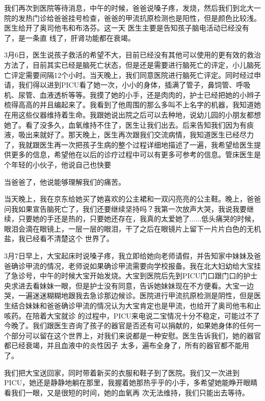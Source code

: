 \documentclass{article}
\begin{document}
我们再次到医院等待消息，中午的时候，爸爸说嗓子疼，发烧，然后我们到北大一院的发热门诊给爸爸挂号检查，爸爸的甲流抗原检测也是阳性，但是颜色比较浅。医生给开了奥司他韦和布洛芬。这一天
\newpage
医生主要是告知孩子脑电活动已经没有了，是一条直
线了，肝肾功能都在衰竭。 

3月6日，医生说孩子救活的希望不大，目前已经没有其他可以使用的更有效的救治方法了，目前其实已经是脑死亡状态，但是还是需要进行脑死亡的评定，小儿脑死亡评定需要间隔12个小时。当天晚上，我们同意医院进行脑死亡评定。同时经过申请，我们得以进到PICU看了她一次，小小的身体，插满了管子，鼻饲管、呼吸机、尿管、血液透析等等。我摸了她的小手，还是肉肉的，护士已经把她的小辫子梳得高高的并且编起来了。我看到了他周围的那么多叫不上名字的机器，我知道她在用这些仪器维持着生命。我跟她说出院之后可以去种地，说幼儿园的小朋友都想她了。看了没多久，血氧维持不住了，医生让我们出去。后来告知我们因为有痰液，吸出来就好了。那天晚上，医生再次跟我们交流病情，我知道医生已经尽力了，我就跟医生再一次把孩子生病的整个过程详细地描述了一遍，我希望给医生提供更多的信息，希望他在以后的诊疗过程中可以有更多可参考的信息。管床医生是个年轻的小伙子，他说自己也快要
\newpage

当爸爸了，他说能够理解我们的痛苦。 

当天晚上，我在京东给她买了她喜欢的公主裙和一双闪亮亮的公主鞋。晚上，爸爸问我如果宣告脑死亡了，我们还要继续坚持吗？我第一次放声大哭，我说我要继续，只要她的手还是热的，只要她还存在，我真的太爱她了......低头痛哭的时候，眼泪会滴在眼镜上，一层一层的眼泪，干了之后在眼镜片上留下一片片白色的无机盐，我已经看不清楚这个
世界了。 

3月7日早上，大宝起床时说嗓子疼，我立即给她向老师请假，并告知家中妹妹及爸爸确诊甲流的情况，老师说如果确诊甲流需要向学校报备。我在北大妇幼给大宝挂了急诊号，中午的时候大宝开始发烧。大宝到医院后先到PICU门口跟门口的护士央求进去看妹妹一眼，但是护士没有同意，告诉她妹妹现在不方便看。大宝一边哭，一遍迷迷糊糊地跟我去急诊那边候诊。医院进行甲流抗原检测是阴性，但是医生结合妹妹和爸爸确诊甲流的情况认为大宝肯定也是甲流，也给开了奥司他韦和止咳药。在陪着大宝就诊
\newpage
的过程中，PICU来电说二宝情况十分不稳定，可能过不了今晚了。我们跟医生咨询了孩子的器官是否还有可以捐献的，如果她身体的任何一个部分可以留在这个世界上，对我们来说都是一种安慰。医生告诉我们，她的器官都已经衰竭，并且血液中的炎性因子
太多，遍布全身了，所有的器官都不能用了。 

我们把大宝送回家，同时带着新买的衣服和鞋子到了医院。我们又一次进到PICU，她还是静静地躺在那里，我握着她那热乎乎的小手，多希望她能睁开眼睛看我们一眼，又是很短的时间，她的血氧再
次无法维持，我们只能出去等待。 
\end{document}
